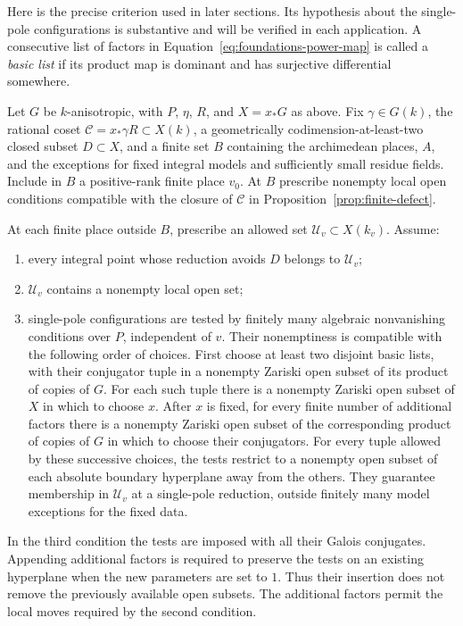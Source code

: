 Here is the precise criterion used in later sections.  Its hypothesis
about the single-pole configurations is substantive and will be
verified in each application.  A consecutive list of factors in
Equation~\ref{eq:foundations-power-map} is called a \emph{basic list}
if its product map is dominant and has surjective differential
somewhere.

\begin{proposition}
\label{prop:power-approximation}
Let \(G\) be \(k\)-anisotropic, with \(P\), \(\eta\), \(R\), and
\(X=x_*G\) as above.  Fix \(\gamma\in G(k)\), the rational coset
\(\mathcal C=x_*\gamma R\subset X(k)\), a
geometrically codimension-at-least-two closed subset \(D\subset X\),
and a finite set \(B\) containing the archimedean places, \(A\), and
the exceptions for fixed integral models and sufficiently small
residue fields.  Include in \(B\) a positive-rank finite place \(v_0\).
At \(B\) prescribe nonempty local open conditions compatible with
the closure of \(\mathcal C\) in
Proposition~\ref{prop:finite-defect}.

At each finite place outside \(B\), prescribe an allowed set
\(\mathcal U_v\subset X(k_v)\).  Assume:
\begin{enumerate}
 \item every integral point whose reduction avoids \(D\) belongs
       to \(\mathcal U_v\);
 \item \(\mathcal U_v\) contains a nonempty local open set;
 \item single-pole configurations are tested by finitely many
       algebraic nonvanishing conditions over \(P\), independent
       of \(v\).  Their nonemptiness is compatible with the following
       order of choices.  First choose at least two disjoint basic
       lists, with their conjugator tuple in a nonempty Zariski
       open subset of its product of copies of \(G\).  For each
       such tuple there is a nonempty Zariski open subset of \(X\)
       in which to choose \(x\).  After \(x\) is fixed, for every
       finite number of additional factors there is a nonempty
       Zariski open subset of the corresponding product of copies
       of \(G\) in which to choose their conjugators.  For every
       tuple allowed by these successive choices, the tests
       restrict to a nonempty open subset of each absolute
       boundary hyperplane away from the others.  They guarantee
       membership in \(\mathcal U_v\) at a single-pole reduction,
       outside finitely many model exceptions for the fixed data.
\end{enumerate}
In the third condition the tests are imposed with all their Galois
conjugates.  Appending additional factors is required to preserve
the tests on an existing hyperplane when the new parameters are
set to \(1\).  Thus their insertion does not remove the previously
available open subsets.  The additional factors permit the local
moves required by the second condition.


\end{proposition}
